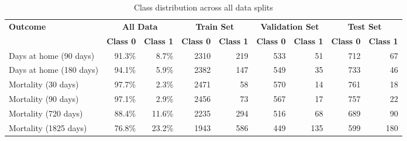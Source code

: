 \documentclass{article}
\begin{document}
\begin{table}[H]
    \centering
    \begin{tabular}{l|rr|rr|rr|rr}
        \toprule
        \multirow{2}{*}{\textbf{Outcome}} & \multicolumn{2}{c|}{\textbf{All Data}} & \multicolumn{2}{c|}{\textbf{Train Set}} & \multicolumn{2}{c|}{\textbf{Validation Set}} & \multicolumn{2}{c}{\textbf{Test Set}}                                                                             \\
        \cmidrule(lr){2-3} \cmidrule(lr){4-5} \cmidrule(lr){6-7} \cmidrule(lr){8-9}
                                          & \textbf{Class 0}                       & \textbf{Class 1}                        & \textbf{Class 0}                             & \textbf{Class 1}                      & \textbf{Class 0} & \textbf{Class 1} & \textbf{Class 0} & \textbf{Class 1} \\
        \midrule
        Days at home (90 days)            & 91.3\%                                 & 8.7\%                                   & 2310                                         & 219                                   & 533              & 51               & 712              & 67               \\
        Days at home (180 days)           & 94.1\%                                 & 5.9\%                                   & 2382                                         & 147                                   & 549              & 35               & 733              & 46               \\
        Mortality (30 days)               & 97.7\%                                 & 2.3\%                                   & 2471                                         & 58                                    & 570              & 14               & 761              & 18               \\
        Mortality (90 days)               & 97.1\%                                 & 2.9\%                                   & 2456                                         & 73                                    & 567              & 17               & 757              & 22               \\
        Mortality (720 days)              & 88.4\%                                 & 11.6\%                                  & 2235                                         & 294                                   & 516              & 68               & 689              & 90               \\
        Mortality (1825 days)             & 76.8\%                                 & 23.2\%                                  & 1943                                         & 586                                   & 449              & 135              & 599              & 180              \\
        \bottomrule
    \end{tabular}
    \caption{Class distribution across all data splits}
    \label{tab:class-distribution}
\end{table}
\end{document}
